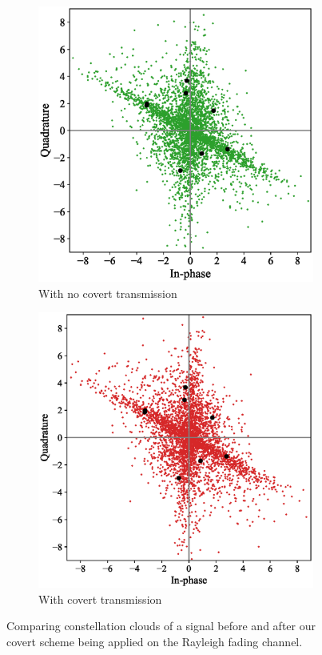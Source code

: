 \begin{figure}[tp!]
	\begin{subfigure}{0.24\textwidth}
		\includegraphics[width=\linewidth]{figs/rayleigh_normal_constellation}
		\caption{With no covert transmission}
	\end{subfigure}
	\hfill
	\begin{subfigure}{0.24\textwidth}
		\includegraphics[width=\linewidth]{figs/rayleigh_covert_constellation}
		\caption{With covert transmission}	
	\end{subfigure}
	\caption{Comparing constellation clouds of a signal before and after our covert scheme being applied on the Rayleigh fading channel.}
	\label{fig:rayleigh_constellation}
\end{figure}